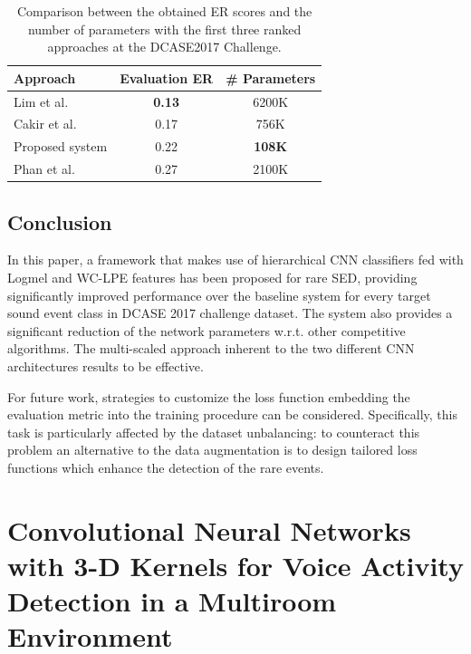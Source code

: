 \begin{table}[t]
	\centering
	\begin{tabular}{|l|c|c|}
		\hline
		Approach        & Evaluation ER & \# Parameters \\ \hline
		Lim et al. \cite{limrare}      & \textbf{0.13}                               & 6200K          \\ 
		Cakir et al.  \cite{cakirconvolutional}   & 0.17                               & 756K          \\ 
		Proposed system & 0.22                               & \textbf{108K}         \\ 
		Phan et al. \cite{phan2017dnn}   & 0.27                               & 2100K          \\ \hline
	\end{tabular}
	\caption[Rare Sound Event Detection - Comparative Results]{Comparison between the obtained ER scores and the number of parameters with the first three ranked approaches at the DCASE2017 Challenge.}
	\label{tab:params}
\end{table}


\subsection{Conclusion}
In this paper, a framework that makes use of hierarchical CNN classifiers fed with Logmel and WC-LPE features has been proposed for rare SED, providing significantly improved performance over the baseline system for every target sound event class in DCASE 2017 challenge dataset. The system also provides a significant reduction of the network parameters w.r.t. other competitive algorithms.  
The multi-scaled approach inherent to the two different CNN architectures results to be effective. 

For future work, strategies to customize the loss function embedding the evaluation metric into the training procedure can be considered. Specifically, this task is particularly affected by the dataset unbalancing: to counteract this problem an alternative to the data augmentation is to design tailored loss functions which enhance the detection of the rare events. 
\newpage

\section[CNN with 3-D Kernels for VAD in a Multiroom Environment]{Convolutional Neural Networks with 3-D Kernels for Voice Activity Detection in a Multiroom Environment}


